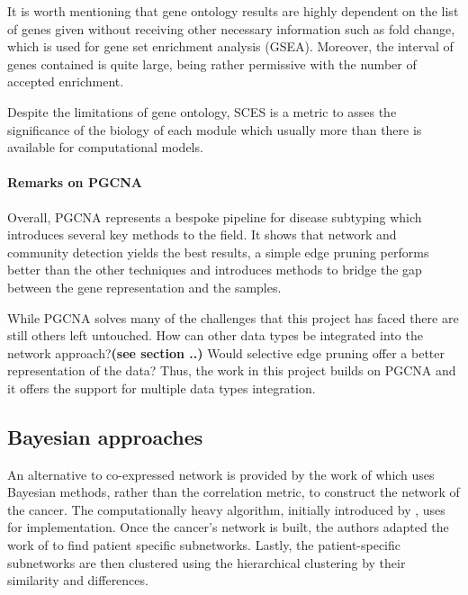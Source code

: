 It is worth mentioning that gene ontology results are highly dependent on the list of genes given without receiving other necessary information such as fold change, which is used for gene set enrichment analysis (GSEA). Moreover, the interval of genes contained is quite large, being rather permissive with the number of accepted enrichment.

Despite the limitations of gene ontology, SCES is a metric to asses the significance of the biology of each module which usually more than there is available for computational models.


\paragraph*{Remarks on PGCNA}

Overall, PGCNA represents a bespoke pipeline for disease subtyping which introduces several key methods to the field. It shows that network and community detection yields the best results, a simple edge pruning performs better than the other techniques and introduces methods to bridge the gap between the gene representation and the samples.

While PGCNA solves many of the challenges that this project has faced there are still others left untouched. How can other data types be integrated into the network approach?\textbf{(see section ..)} Would selective edge pruning offer a better representation of the data? Thus, the work in this project builds on PGCNA and it offers the support for multiple data types integration.


\subsection{Bayesian approaches} \label{s:lit:bayesian}

An alternative to co-expressed network is provided by the work of \citet{Nakazawa2021-yq} which uses Bayesian methods, rather than the correlation metric, to construct the network of the cancer. The computationally heavy algorithm, initially introduced by \citet{Imoto2001-uc}, uses \citet{Tamada2011-ok} for implementation. Once the cancer’s network is built, the authors adapted the work of \citet{Tanaka2020-mw} to find patient specific subnetworks. Lastly, the patient-specific subnetworks are then clustered using the hierarchical clustering by their similarity and differences.

